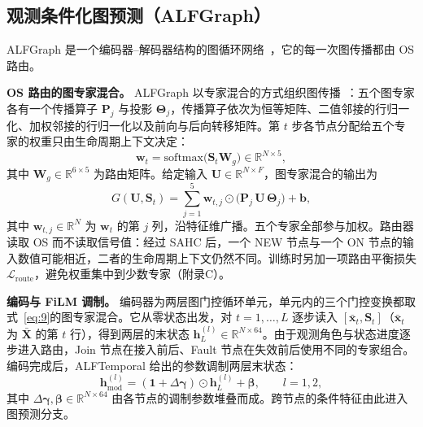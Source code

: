 \subsection{观测条件化图预测（ALFGraph）}\label{sec:3_4}

ALFGraph 是一个编码器–解码器结构的图循环网络~\citep{li2018diffusion}，它的每一次图传播都由 OS 路由。

\textbf{OS 路由的图专家混合。} ALFGraph 以专家混合的方式组织图传播~\citep{zhou2025mogernn,wang2023graph}：五个图专家各有一个传播算子 $\mathbf{P}_j$ 与投影 $\boldsymbol{\Theta}_j$，传播算子依次为恒等矩阵、二值邻接的行归一化、加权邻接的行归一化以及前向与后向转移矩阵。第 $t$ 步各节点分配给五个专家的权重只由生命周期上下文决定：
\begin{equation}\label{eq:8}
\mathbf{w}_t=\mathrm{softmax}\big(\mathbf{S}_t\mathbf{W}_g\big)\in\mathbb{R}^{N\times5},
\end{equation}
其中 $\mathbf{W}_g\in\mathbb{R}^{6\times5}$ 为路由矩阵。给定输入 $\mathbf{U}\in\mathbb{R}^{N\times F}$，图专家混合的输出为
\begin{equation}\label{eq:9}
G(\mathbf{U},\mathbf{S}_t)=\sum_{j=1}^{5}\mathbf{w}_{t,j}\odot\big(\mathbf{P}_j\,\mathbf{U}\,\boldsymbol{\Theta}_j\big)+\mathbf{b},
\end{equation}
其中 $\mathbf{w}_{t,j}\in\mathbb{R}^{N}$ 为 $\mathbf{w}_t$ 的第 $j$ 列，沿特征维广播。五个专家全部参与加权。路由器读取 OS 而不读取信号值：经过 SAHC 后，一个 NEW 节点与一个 ON 节点的输入数值可能相近，二者的生命周期上下文仍然不同。训练时另加一项路由平衡损失 $\mathcal{L}_{\mathrm{route}}$，避免权重集中到少数专家（附录C）。

\textbf{编码与 FiLM 调制。} 编码器为两层图门控循环单元，单元内的三个门控变换都取式~\eqref{eq:9}的图专家混合。它从零状态出发，对 $t=1,\dots,L$ 逐步读入 $[\bar{\mathbf{x}}_t,\mathbf{S}_t]$（$\bar{\mathbf{x}}_t$ 为 $\bar{\mathbf{X}}$ 的第 $t$ 行），得到两层的末状态 $\mathbf{h}^{(l)}_L\in\mathbb{R}^{N\times64}$。由于观测角色与状态进度逐步进入路由，Join 节点在接入前后、Fault 节点在失效前后使用不同的专家组合。编码完成后，ALFTemporal 给出的参数调制两层末状态：
\begin{equation}\label{eq:10}
\mathbf{h}^{(l)}_{\mathrm{mod}}=(\mathbf{1}+\Delta\boldsymbol{\gamma})\odot\mathbf{h}^{(l)}_L+\boldsymbol{\beta},\qquad l=1,2,
\end{equation}
其中 $\Delta\boldsymbol{\gamma},\boldsymbol{\beta}\in\mathbb{R}^{N\times64}$ 由各节点的调制参数堆叠而成。跨节点的条件特征由此进入图预测分支。


